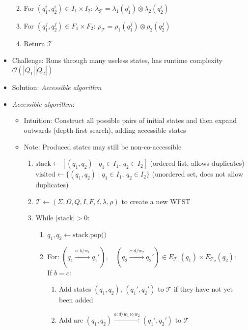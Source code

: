 \begin{itemize}
\begin{enumerate}
\begin{itemize}
        \end{itemize}
        \item For $(q_1^i, q_2^i) \in I_1 \times I_2$: $
        \lambda_\mathcal{T} = \lambda_1(q_1^i) \otimes \lambda_2(q_2^i)
        $
        \item For $(q_1^f, q_2^f) \in F_1 \times F_2$: $
        \rho_\mathcal{T} = \rho_1(q_1^f) \otimes \rho_2(q_2^f)
        $
        \item Return $\mathcal{T}$
    \end{enumerate}
    \item Challenge: Runs through many useless states, has runtime complexity $\mathcal{O}(|Q_1||Q_2|)$
    \item Solution: \emph{Accessible algorithm}
    \item \emph{Accessible algorithm}:
    \begin{itemize}
        \item Intuition: Construct all possible pairs of initial states and then expand outwards (depth-first search), adding accessible states
        \item Note: Produced states may still be non-co-accessible
        \begin{enumerate}
            \item $\textrm{stack} \gets [(q_1, q_2) \mid q_1 \in I_1, \, q_2 \in I_2]$ (ordered list, allows duplicates)\\
            $\textrm{visited} \gets \{(q_1, q_2) \mid q_1 \in I_1, \, q_2 \in I_2\}$ (unordered set, does not allow duplicates)
            \item $\mathcal{T} \gets (\Sigma, \Omega, Q, I, F, \delta, \lambda, \rho)$ to create a new WFST
            \item While $|\textrm{stack}| > 0$:
            \begin{enumerate}
                \item $q_1, q_2 \gets \textrm{stack.pop()}$
                \item For:
                $
                (q_1 \xrightarrow{a:b/w_1} q_1'), \quad (q_2 \xrightarrow{c:d/w_2} q_2') \in E_{\mathcal{T}_1}(q_1) \times E_{\mathcal{T}_2}(q_2)$:\\
                If $b=c$:
                \begin{enumerate}
                    \item Add states $(q_1, q_2)$, $(q_1', q_2')$ to $\mathcal{T}$ if they have not yet been added
                    \item Add arc $(q_1, q_2) \xrightarrow{a:d/w_1 \otimes w_2} (q_1', q_2')$ to $\mathcal{T}$

\end{enumerate}
\end{enumerate}
\end{enumerate}
\end{itemize}
\end{itemize}
